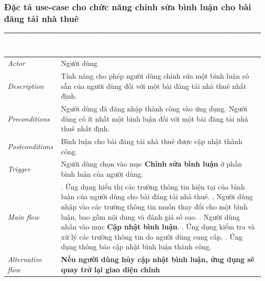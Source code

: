 \subsubsection{Đặc tả use-case cho chức năng chỉnh sửa bình luận cho bài đăng tải nhà thuê}
\begin{center}
    \arrayrulewidth=2pt
    \begin{longtable}{
        |>{\raggedright\arraybackslash}p{3cm}
        |>{\raggedright\arraybackslash}p{13cm}
        |}
        \hline
        \rowcolor{cyan!75!black} \textcolor{white}{\textbf{Use-case name}} & \textcolor{white}{\textbf{CHỈNH SỬA BÌNH LUẬN CHO BÀI ĐĂNG TẢI NHÀ THUÊ}}
        \\\hline
        \rowcolor{cyan!10!white} \textit{Actor} & Người dùng
        \\\hdashline
        \rowcolor{cyan!10!white} \textit{Description} & Tính năng cho phép người dùng chỉnh sửa một bình luận có sẵn của người dùng đối với một bài đăng tải nhà thuê nhất định.
        \\\hdashline
        \rowcolor{cyan!10!white} \textit{Preconditions} & Người dùng đã đăng nhập thành công vào ứng dụng. Người dùng có ít nhất một bình luận đối với một bài đăng tải nhà thuê nhất định.
        \\\hdashline
        \rowcolor{cyan!10!white} \textit{Postconditions} & Bình luận cho bài đăng tải nhà thuê được cập nhật thành công.
        \\\hdashline
        \rowcolor{cyan!10!white} \textit{Trigger} & Người dùng chọn vào mục \textbf{Chỉnh sửa bình luận} ở phần bình luận của người dùng.
        \\\hdashline
        \rowcolor{cyan!10!white} \textit{Main flow} &
        1. Ứng dụng hiển thị các trường thông tin hiện tại của bình luận của người dùng cho bài đăng tải nhà thuê. \newline
        2. Người dùng nhập vào các trường thông tin muốn thay đổi cho một bình luận, bao gồm nội dung và đánh giá số sao. \newline
        3. Người dùng nhấn vào mục \textbf{Cập nhật bình luận}. \newline
        4. Ứng dụng kiểm tra và xử lý các trường thông tin do người dùng cung cấp. \newline
        5. Ứng dụng thông báo cập nhật bình luận thành công.
        \\\hdashline
        \rowcolor{cyan!10!white} \textit{Alternative flow} & 
        \textbf{Nếu người dùng hủy cập nhật bình luận, ứng dụng sẽ quay trở lại giao diện chính} \newline

\end{longtable}
\end{center}
